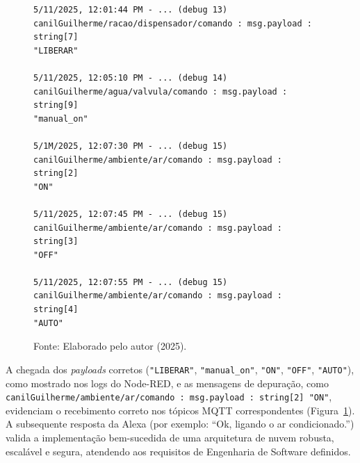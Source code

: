 \begin{figure}[htbp]
\centering

\begin{lstlisting}
5/11/2025, 12:01:44 PM - ... (debug 13)
canilGuilherme/racao/dispensador/comando : msg.payload : string[7]
"LIBERAR"

5/11/2025, 12:05:10 PM - ... (debug 14)
canilGuilherme/agua/valvula/comando : msg.payload : string[9]
"manual_on"

5/1M/2025, 12:07:30 PM - ... (debug 15)
canilGuilherme/ambiente/ar/comando : msg.payload : string[2]
"ON"

5/11/2025, 12:07:45 PM - ... (debug 15)
canilGuilherme/ambiente/ar/comando : msg.payload : string[3]
"OFF"

5/11/2025, 12:07:55 PM - ... (debug 15)
canilGuilherme/ambiente/ar/comando : msg.payload : string[4]
"AUTO"
\end{lstlisting}

\caption{Logs de depuração do Node-RED capturados durante o teste de integração, confirmando o recebimento dos comandos MQTT (\texttt{LIBERAR}, \texttt{manual\_on}, \texttt{ON}, \texttt{OFF}, \texttt{AUTO}) originados pela Alexa.}
\caption*{Fonte: Elaborado pelo autor (2025).}
\label{fig:logs_debug} %

\end{figure}


\vspace{1em}







A chegada dos \textit{payloads} corretos (\texttt{"LIBERAR"}, \texttt{"manual\_on"}, \texttt{"ON"}, \texttt{"OFF"}, \texttt{"AUTO"}), como mostrado nos logs 
do Node-RED, e as mensagens de depuração, como \texttt{canilGuilherme/ambiente/ar/comando : msg.payload : string[2] "ON"}, evidenciam o recebimento correto nos tópicos MQTT correspondentes (Figura~\ref{fig:logs_debug}).
A subsequente resposta da Alexa (por exemplo: “Ok, ligando o ar condicionado.”) valida a implementação bem-sucedida de uma arquitetura de nuvem robusta, escalável e segura, atendendo aos requisitos de Engenharia de Software definidos.








